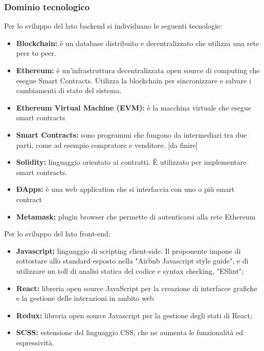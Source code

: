 \subsubsection{Dominio tecnologico}
Per lo sviluppo del lato backend si individuano le seguenti tecnologie:
\begin{itemize}
    \item \textbf{Blockchain: }è un database distribuito e 
    decentralizzato che utilizza una rete peer to peer.
	\item \textbf{Ethereum: }è un'infrastruttura decentralizzata open source di computing che
	esegue Smart Contracts. Utilizza la blockchain per sincronizzare e salvare i cambiamenti di stato
	del sistema.
	\item \textbf{Ethereum Virtual Machine (EVM): }è la macchina virtuale che esegue smart contracts
	\item \textbf{Smart Contracts: } sono programmi che fungono da intermediari tra due parti, come ad esempio
	compratore e venditore. [da finire]
	\item \textbf{Solidity: }linguaggio orientato ai contratti. \`E utilizzato per implementare smart contracts.
	\item \textbf{ÐApps: }è una web application che si interfaccia con uno o più smart contract
	\item \textbf{Metamask:} plugin browser che permette di autenticarsi alla rete Ethereum

\end{itemize}
Per lo sviluppo del lato front-end:
\begin{itemize}
	\item \textbf{Javascript:} linguaggio di scripting client-side. Il proponente impone di sottostare allo standard esposto nella "Airbnb Javascript style guide", e di utilizzare un toll di analisi statica del codice e syntax checking, "ESlint";
	\item \textbf{React:}  libreria open source JavaScript per la creazione di interfacce grafiche e la gestione delle interazioni in ambito web
	\item \textbf {Redux:} libreria open source Javascript per la gestione degli stati di React;
	
	\item \textbf{SCSS:} estensione del linguaggio CSS, che ne aumenta le funzionalità ed espressività.
\end{itemize}


